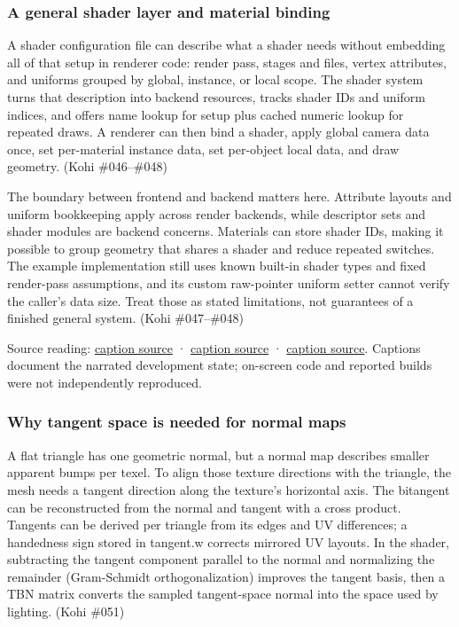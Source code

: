 \subsubsection{A general shader layer and material binding}\label{06-engine-ii-ch025-a-general-shader-layer-and-material-binding}

A shader configuration file can describe what a shader needs without embedding all of that setup in renderer code: render pass, stages and files, vertex attributes, and uniforms grouped by global, instance, or local scope. The shader system turns that description into backend resources, tracks shader IDs and uniform indices, and offers name lookup for setup plus cached numeric lookup for repeated draws. A renderer can then bind a shader, apply global camera data once, set per-material instance data, set per-object local data, and draw geometry. (Kohi \#046--\#048)

The boundary between frontend and backend matters here. Attribute layouts and uniform bookkeeping apply across render backends, while descriptor sets and shader modules are backend concerns. Materials can store shader IDs, making it possible to group geometry that shares a shader and reduce repeated switches. The example implementation still uses known built-in shader types and fixed render-pass assumptions, and its custom raw-pointer uniform setter cannot verify the caller's data size. Treat those as stated limitations, not guarantees of a finished general system. (Kohi \#047--\#048)

Source reading: \href{https://www.youtube.com/watch?v=T8-Tv4UsKCk}{caption source} · \href{https://www.youtube.com/watch?v=4E0v_5Wva-8}{caption source} · \href{https://www.youtube.com/watch?v=9nP3aBsrCXs}{caption source}. Captions document the narrated development state; on-screen code and reported builds were not independently reproduced.

\subsubsection{Why tangent space is needed for normal maps}\label{06-engine-ii-ch025-why-tangent-space-is-needed-for-normal-maps}

A flat triangle has one geometric normal, but a normal map describes smaller apparent bumps per texel. To align those texture directions with the triangle, the mesh needs a tangent direction along the texture's horizontal axis. The bitangent can be reconstructed from the normal and tangent with a cross product. Tangents can be derived per triangle from its edges and UV differences; a handedness sign stored in tangent.w corrects mirrored UV layouts. In the shader, subtracting the tangent component parallel to the normal and normalizing the remainder (Gram-Schmidt orthogonalization) improves the tangent basis, then a TBN matrix converts the sampled tangent-space normal into the space used by lighting. (Kohi \#051)

